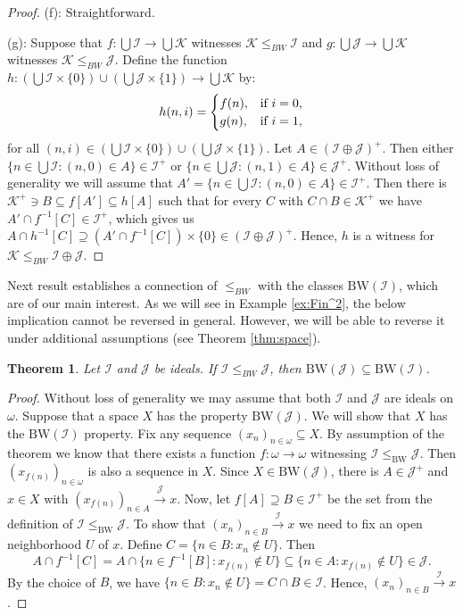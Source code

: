 \documentclass{amsart}
\theoremstyle{plain}
\newtheorem{theorem}{Theorem}[section]
\theoremstyle{definition}
\theoremstyle{remark}
\newcommand{\cI}{\mathcal{I}}
\newcommand{\I}{\cI}
\newcommand{\cJ}{\mathcal{J}}
\newcommand{\J}{\cJ}
\newcommand{\BW}{\mathrm{BW}}
\begin{document}
\begin{proof}
\medskip

(f): Straightforward.

(g): Suppose that $f:\bigcup\I\to\bigcup\mathcal{K}$ witnesses $\mathcal{K}\leq_{BW}\I$ and $g:\bigcup\J\to\bigcup\mathcal{K}$ witnesses $\mathcal{K}\leq_{BW}\J$. Define the function $h:(\bigcup\I\times\{0\})\cup(\bigcup\J\times\{1\})\to\bigcup\mathcal{K}$ by:
\[
h(n,i)=\begin{cases}
f(n), & \text{if }i=0,\cr
g(n), & \text{if }i=1,
\end{cases}
\]
for all $(n,i)\in (\bigcup\I\times\{0\})\cup(\bigcup\J\times\{1\})$. Let $A\in(\I\oplus\J)^+$. Then either $\{n\in\bigcup\I:(n,0)\in A\}\in\I^+$ or $\{n\in\bigcup\J:(n,1)\in A\}\in\J^+$. Without loss of generality we will assume that $A'=\{n\in\bigcup\I:(n,0)\in A\}\in\I^+$. Then there is $\mathcal{K}^+\ni B\subseteq f[A']\subseteq h[A]$ such that for every $C$ with $C\cap B\in\mathcal{K}^+$ we have $A'\cap f^{-1}[C]\in\I^+$, which gives us $A\cap h^{-1}[C]\supseteq (A'\cap f^{-1}[C])\times\{0\}\in(\I\oplus\J)^+$. Hence, $h$ is a witness for $\mathcal{K}\leq_{BW}\I \oplus \J$.
\end{proof}

Next result establishes a connection of $\leq_{BW}$ with the classes $\BW(\I)$, which are of our main interest. As we will see in Example \ref{ex:Fin^2}, the below implication cannot be reversed in general. However, we will be able to reverse it under additional assumptions (see Theorem \ref{thm:space}).

\begin{theorem}
\label{thm:zawieranieBW}
Let $\I$ and $\J$ be ideals. If $\I\leq_{BW}\J$, then $\BW(\J)\subseteq\BW(\I)$.
\end{theorem}

\begin{proof}
Without loss of generality we may assume that both $\I$ and $\J$ are ideals on $\omega$. Suppose that a space $X$ has the property $\BW(\J)$. We will show that $X$ has the $\BW(\I)$ property. Fix any sequence $(x_n)_{n \in \omega} \subseteq X$. By assumption of the theorem we know that there exists a function $f:\omega \rightarrow \omega$  witnessing $\I \leq_\BW \J$. Then $(x_{f(n)})_{n \in \omega}$ is also a sequence in $X$. Since $X \in \BW(\J)$, there is $A \in \J^+$ and $x \in X$ with $(x_{f(n)})_{n \in A} \overset{\J}\longrightarrow x$. Now, let $ f[A]\supseteq B \in \I^+$ be the set from the definition of $\I \leq_\BW \J$. To show that $(x_n)_{n \in B} \overset{\I}\longrightarrow x$ we need to fix an open neighborhood $U$ of $x$. Define $C=\{n \in B: x_n \notin U \}$.  Then 
$$A \cap f^{-1}[C]=A \cap \{n \in f^{-1}[B]: x_{f(n)} \notin U \} \subseteq \{n \in A: x_{f(n)} \notin U\} \in \J .$$ 
By the choice of $B$, we have $\{n \in B : x_n \notin U \}= C \cap B \in \I$. Hence, $(x_n)_{n \in B} \overset{\I}\longrightarrow x$. 
\end{proof}
\end{document}
